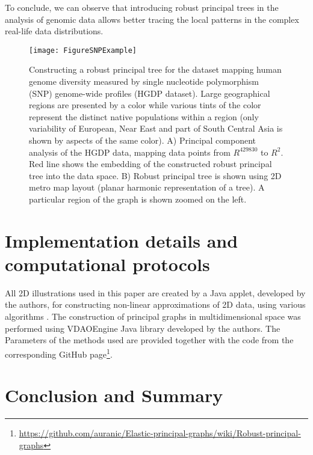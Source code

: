 \documentclass[graybox]{archivesofdatascience}
\begin{document}
To conclude, we can observe that introducing robust principal trees in the analysis of genomic data allows better tracing the local patterns in the complex real-life data distributions.

\begin{figure}[tbp]
\texttt{[image: FigureSNPExample]}
\caption{Constructing a robust principal tree for the dataset mapping human genome diversity measured by single nucleotide polymorphism (SNP) genome-wide profiles (HGDP dataset). Large geographical regions are presented by a color while various tints of the color represent the distinct native populations within a region (only variability of European, Near East and part of South Central Asia is shown by aspects of the same color). A) Principal component analysis of the HGDP data, mapping data points from $R^{429830}$ to $R^{2}$. Red line shows the embedding of the constructed robust principal tree into the data space. B) Robust principal tree is shown using 2D metro map layout (planar harmonic representation of a tree). A particular region of the graph is shown zoomed on the left.}
\label{GeoSNPExample}       \end{figure}


\section{Implementation details and computational protocols}\label{Implementation}

All 2D illustrations used in this paper are created by a Java applet, developed by the authors, for constructing non-linear approximations of 2D data, using various algorithms \citep{Applet}.  The construction of principal graphs in multidimensional space was performed using VDAOEngine Java library developed by the authors. The Parameters of the methods used are provided together with the code from the corresponding GitHub page\footnote{\url{https://github.com/auranic/Elastic-principal-graphs/wiki/Robust-principal-graphs}}.



\section{Conclusion and Summary}\label{Discussion}
\end{document}
